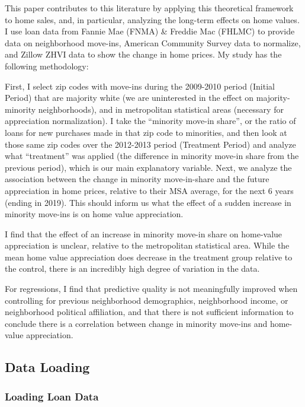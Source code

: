 \documentclass[11pt]{article}
\begin{document}
This paper contributes to this literature by applying this theoretical framework to home sales, and, in particular, analyzing the long-term effects on home values. I use loan data from Fannie Mae (FNMA) \& Freddie Mac (FHLMC) to provide data on
neighborhood move-ins, American Community Survey data to normalize, and
Zillow ZHVI data to show the change in home prices. My study has the
following methodology:

First, I select zip codes with move-ins during the 2009-2010 period
(Initial Period) that are majority white (we are uninterested in the
effect on majority-minority neighborhoods), and in metropolitan
statistical areas (necessary for appreciation normalization). I take the
``minority move-in share'', or the ratio of loans for new purchases made
in that zip code to minorities, and then look at those same zip codes
over the 2012-2013 period (Treatment Period) and analyze what
``treatment'' was applied (the difference in minority move-in share from
the previous period), which is our main explanatory variable. Next, we
analyze the association between the change in minority move-in-share and
the future appreciation in home prices, relative to their MSA average,
for the next 6 years (ending in 2019). This should inform us what the
effect of a sudden increase in minority move-ins is on home value
appreciation.

I find that the effect of an increase in minority move-in share on
home-value appreciation is unclear, relative to the metropolitan
statistical area. While the mean home value appreciation does decrease
in the treatment group relative to the control, there is an incredibly
high degree of variation in the data.

For regressions, I find that predictive quality is not meaningfully improved when controlling for previous neighborhood demographics, neighborhood income, or neighborhood political affiliation, and that there is not sufficient information to conclude there is a correlation between change in minority move-ins and home-value appreciation.

    \subsection{Data Loading}\label{data-loading}

    \subsubsection{Loading Loan Data}\label{loading-loan-data}
\end{document}
